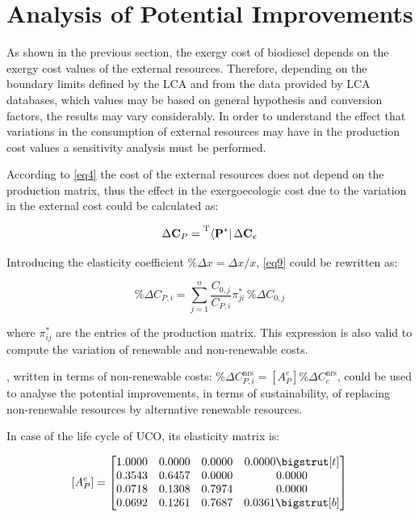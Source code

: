 \documentclass[sustainability,article,submit,moreauthors,pdftex,12pt,a4paper]{mdpi}
\newcommand{\tmopcr}[1]{\ensuremath{\prescript{\mathrm{T}}{}{\left\langle {\textbf{#1}^\ast } \right|}}}
\newcommand{\vm}[1]{\ensuremath{\mathbf{#1}}}
\newcommand{\ems}[3][\phantom{\ast}]{\ensuremath{{#2}_{#3}^\mathrm{#1}}}
\begin{document}
\FloatBarrier

\section{Analysis of Potential Improvements}

As shown in the previous section, the exergy cost of biodiesel depends on the exergy cost values of the external resources. Therefore, depending on the boundary limits defined by the LCA and from the data provided by LCA databases, which values may be based on general hypothesis and conversion factors, the results may vary considerably. In order to understand the effect that variations in the consumption of external resources may have in the production cost values a sensitivity analysis must be performed.

According to \cref{eq4} the cost of the external resources does not depend on the production matrix, thus the effect in the exergoecologic cost due to the variation in the external cost could be calculated as:

\begin{equation}
 \Delta \vm{C}_P =\tmopcr{P} \, \Delta\vm{C}_e
 \label{eq9}
\end{equation}

Introducing the elasticity coefficient $\%\Delta x = \Delta x / x$, \cref{eq9} could be rewritten as:

\begin{equation}
\%\Delta C_{P,i}=\sum\limits_{j=1}^{n}{\frac{C_{0,j}}{C_{P,i}}\pi_{ji}^{\ast}}\,\%\Delta C_{0,j}
\label{eq10}
\end{equation}

\noindent where $\pi_{ij}^{\ast}$ are the entries of the production matrix. This expression is also valid to compute the variation of renewable and non-renewable costs.

, written in terms of non-renewable costs:  $\%\Delta \ems[nrs]{C}{P,i}=[A_P^e] \% \Delta \ems[nrs]{C}{e}$, could be used to analyse the potential improvements, in terms of sustainability, of replacing non-renewable resources by alternative renewable resources.

In case of the life cycle of UCO, its elasticity matrix is:

\[
[A_P^e]=\begin{bmatrix} 
1.0000 & 0.0000 & 0.0000 & 0.0000 \bigstrut[t]\\
0.3543 & 0.6457 & 0.0000 & 0.0000 \\
0.0718 & 0.1308 & 0.7974 & 0.0000 \\
0.0692 & 0.1261 & 0.7687 & 0.0361 \bigstrut[b]\\
\end{bmatrix}
\]
\end{document}

